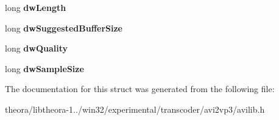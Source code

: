 \begin{DoxyCompactItemize}
\item 
\hypertarget{struct_a_v_i_stream_header_a3ec02be64fa99e327b446773a8ebd620}{long {\bfseries dw\+Length}}\label{struct_a_v_i_stream_header_a3ec02be64fa99e327b446773a8ebd620}

\item 
\hypertarget{struct_a_v_i_stream_header_adc1312291bbcba3b098b4085e6a0149c}{long {\bfseries dw\+Suggested\+Buffer\+Size}}\label{struct_a_v_i_stream_header_adc1312291bbcba3b098b4085e6a0149c}

\item 
\hypertarget{struct_a_v_i_stream_header_aa6d129f17e203fdca549668f2aeb7a99}{long {\bfseries dw\+Quality}}\label{struct_a_v_i_stream_header_aa6d129f17e203fdca549668f2aeb7a99}

\item 
\hypertarget{struct_a_v_i_stream_header_a62c3ca9e480b19d75914c24018a6763f}{long {\bfseries dw\+Sample\+Size}}\label{struct_a_v_i_stream_header_a62c3ca9e480b19d75914c24018a6763f}

\end{DoxyCompactItemize}


The documentation for this struct was generated from the following file\+:\begin{DoxyCompactItemize}
\item 
theora/libtheora-\/1../win32/experimental/transcoder/avi2vp3/avilib.\+h\end{DoxyCompactItemize}
